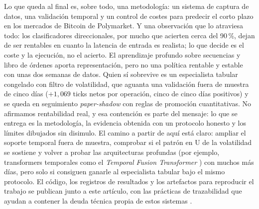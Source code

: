 \documentclass[11pt,a4paper]{article}
\begin{document}
Lo que queda al final es, sobre todo, una metodología: un sistema de captura de
datos, una validación temporal y un control de costes para predecir el corto plazo
en los mercados de Bitcoin de Polymarket. Y una observación que lo atraviesa todo:
los clasificadores direccionales, por mucho que acierten cerca del 90\,\%, dejan de
ser rentables en cuanto la latencia de entrada es realista; lo que decide es el
coste y la ejecución, no el acierto. El aprendizaje profundo sobre secuencias y
libro de órdenes aporta representación, pero no una política rentable y estable con
unas dos semanas de datos. Quien sí sobrevive es un especialista tabular congelado
con filtro de volatilidad, que aguanta una validación fuera de muestra de cinco días
($+1{,}069$ ticks netos por operación, cinco de cinco días positivos) y se queda en
seguimiento \emph{paper-shadow} con reglas de promoción cuantitativas. No afirmamos
rentabilidad real, y esa contención es parte del mensaje: lo que se entrega es la
metodología, la evidencia obtenida con un protocolo honesto y los límites dibujados
sin disimulo. El camino a partir de aquí está claro: ampliar el soporte temporal
fuera de muestra, comprobar si el patrón en U de la volatilidad se sostiene y volver
a probar las arquitecturas profundas (por ejemplo, transformers temporales como el
\emph{Temporal Fusion Transformer} \cite{lim2021tft}) con muchos más días, pero solo
si consiguen ganarle al especialista tabular bajo el mismo protocolo. El código, los registros de
resultados y los artefactos para reproducir el trabajo se publican junto a este
artículo, con las prácticas de trazabilidad que ayudan a contener la deuda técnica
propia de estos sistemas \cite{sculley2015debt}.
\end{document}
